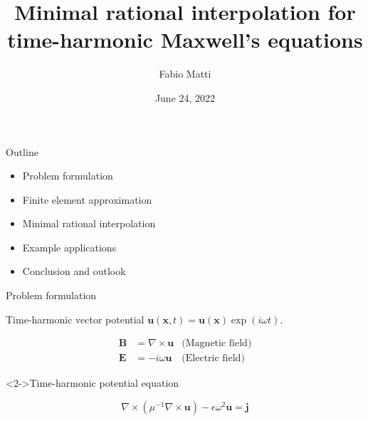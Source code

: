 \documentclass{beamer}
\title{Minimal rational interpolation for \\
       time-harmonic Maxwell's equations}
\date{June 24, 2022}
\author{Fabio Matti}
\begin{document}
\begin{frame}[noframenumbering]

    \titlepage

\end{frame}

\begin{frame}{Outline}

    \begin{itemize}
        \item<1-> Problem formulation
        \item<2-> Finite element approximation
        \item<3-> Minimal rational interpolation
        \item<4-> Example applications
        \item<5-> Conclusion and outlook
    \end{itemize}

\end{frame}

\begin{frame}{Problem formulation}

    Time-harmonic vector potential $\mathbf{u}(\mathbf{x}, t) = \mathbf{u}(\mathbf{x})\exp(i \omega t)$.

    \begin{align*}
        \mathbf{B} &= \nabla \times \mathbf{u} &\text{(Magnetic field)}\\
        \mathbf{E} &= - i \omega \mathbf{u} &\text{(Electric field)}
    \end{align*}

    \begin{block}<2->{Time-harmonic potential equation}
        
        \begin{equation}
            \nabla \times (\mu^{-1} \nabla \times \mathbf{u}) - \epsilon \omega^2 \mathbf{u} = \mathbf{j}
            \label{equ:gauss-bonnet}
        \end{equation}

    \end{block}

\end{frame}
\end{document}
